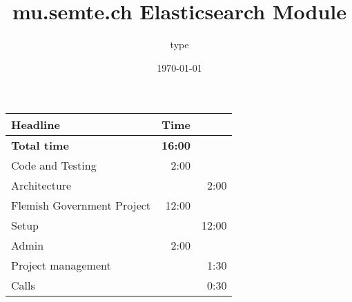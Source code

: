 \documentclass[11pt]{article}
\author{type}
\date{\today}
\title{mu.semte.ch Elasticsearch Module}
\begin{document}
\maketitle
\begin{center}
\begin{tabular}{lrr}
Headline & Time & \\
\hline
\textbf{Total time} & \textbf{16:00} & \\
\hline
Code and Testing & 2:00 & \\
\hspace*{1em} Architecture &  & 2:00\\
Flemish Government Project & 12:00 & \\
\hspace*{1em} Setup &  & 12:00\\
Admin & 2:00 & \\
\hspace*{1em} Project management &  & 1:30\\
\hspace*{1em} Calls &  & 0:30\\
\end{tabular}
\end{center}
\end{document}
